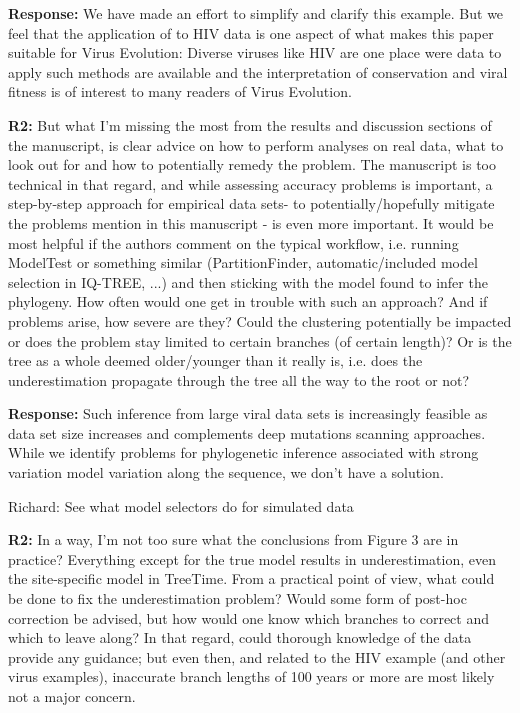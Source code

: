 \documentclass[aps,rmp,onecolumn]{revtex4-1}
\newcommand{\Richard}[1]{{\color{drab}Richard: #1}}
\newcommand{\refb}[1]{\textbf{R2:} #1}
\newcommand{\response}[1]{{\color{black}\textbf{Response:} #1}}
\begin{document}
\response{We have made an effort to simplify and clarify this example. But we feel that the application of to HIV data is one aspect of what makes this paper suitable for Virus Evolution: Diverse viruses like HIV are one place were data to apply such methods are available and the interpretation of conservation and viral fitness is of interest to many readers of Virus Evolution. }

\refb{But what I’m missing the most from the results and discussion sections of the manuscript, is clear advice on how to perform analyses on real data, what to look out for and how to potentially remedy the problem. The manuscript is too technical in that regard, and while assessing accuracy problems is important, a step-by-step approach for empirical data sets- to potentially/hopefully mitigate the problems mention in this manuscript - is even more important. It would be most helpful if the authors comment on the typical workflow, i.e. running ModelTest or something similar (PartitionFinder, automatic/included model selection in IQ-TREE, ...) and then sticking with the model found to infer the phylogeny. How often would one get in trouble with such an approach? And if problems arise, how severe are they? Could the clustering potentially be impacted or does the problem stay limited to certain branches (of certain length)? Or is the tree as a whole deemed older/younger than it really is, i.e. does the underestimation propagate through the tree all the way to the root or not?}

\response{
    Such inference from large viral data sets is increasingly feasible as data set size increases and complements deep mutations scanning approaches.
    While we identify problems for phylogenetic inference associated with strong variation model variation along the sequence, we don't have a solution.
}


\Richard{See what model selectors do for simulated data}


\refb{In a way, I’m not too sure what the conclusions from Figure 3 are in practice? Everything except for the true model results in underestimation, even the site-specific model in TreeTime. From a practical point of view, what could be done to fix the underestimation problem? Would some form of post-hoc correction be advised, but how would one know which branches to correct and which to leave along? In that regard, could thorough knowledge of the data provide any guidance; but even then, and related to the HIV example (and other virus examples), inaccurate branch lengths of 100 years or more are most likely not a major concern.}
\end{document}
